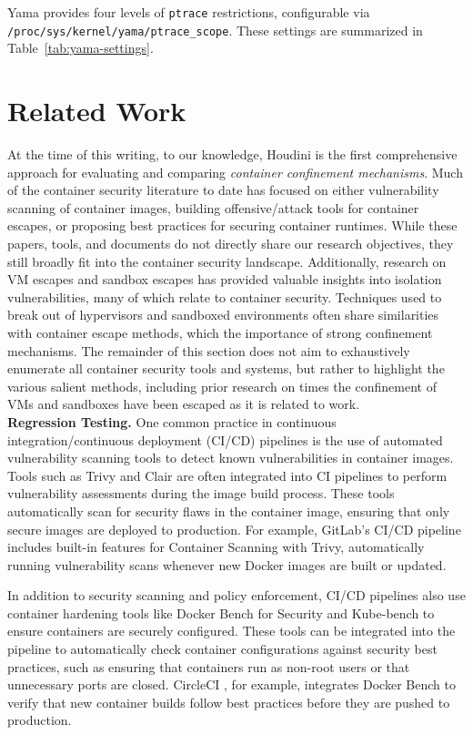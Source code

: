 \documentclass[12pt]{report}
\begin{document}
\begin{doublespace}
Yama provides four levels of \texttt{ptrace} restrictions, configurable via \texttt{/proc/sys/kernel/yama/ptrace\_scope}. These settings are summarized in Table~\ref{tab:yama-settings}.

\section{Related Work}

At the time of this writing, to our knowledge, Houdini is the first comprehensive approach for evaluating and comparing \textit{container confinement mechanisms}. Much of the container security literature to date has focused on either vulnerability scanning of container images, building offensive/attack tools for container escapes, or proposing best practices for securing container runtimes. While these papers, tools, and documents do not directly share our research objectives, they still broadly fit into the container security landscape. Additionally, research on VM escapes and sandbox escapes has provided valuable insights into isolation vulnerabilities, many of which relate to container security. Techniques used to break out of hypervisors and sandboxed environments often share similarities with container escape methods, which the importance of strong confinement mechanisms. The remainder of this section does not aim to exhaustively enumerate all container security tools and systems, but rather to highlight the various salient methods, including prior research on times the confinement of VMs and sandboxes have been escaped as it is related to work.\\

\noindent\textbf{Regression Testing.} One common practice in continuous integration/continuous deployment (CI/CD) pipelines is the use of automated vulnerability scanning tools to detect known vulnerabilities in container images. Tools such as Trivy \cite{trivy} and Clair \cite{clair} are often integrated into CI pipelines to perform vulnerability assessments during the image build process. These tools automatically scan for security flaws in the container image, ensuring that only secure images are deployed to production. For example, GitLab’s CI/CD pipeline includes built-in features for Container Scanning with Trivy, automatically running vulnerability scans whenever new Docker images are built or updated.

In addition to security scanning and policy enforcement, CI/CD pipelines also use container hardening tools like Docker Bench for Security \cite{docker_bench} and Kube-bench \cite{kube_bench} to ensure containers are securely configured. These tools can be integrated into the pipeline to automatically check container configurations against security best practices, such as ensuring that containers run as non-root users or that unnecessary ports are closed. CircleCI \cite{circleci}, for example, integrates Docker Bench to verify that new container builds follow best practices before they are pushed to production.\\


\end{doublespace}
\end{document}
